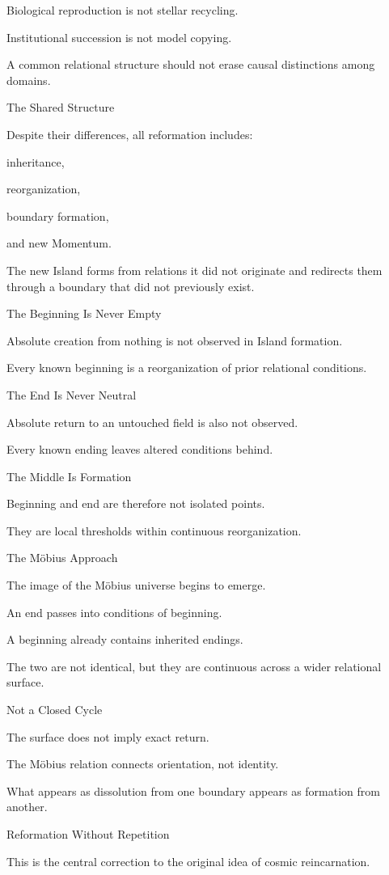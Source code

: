 Biological reproduction is not stellar recycling.

Institutional succession is not model copying.

A common relational structure should not erase causal distinctions among domains.

The Shared Structure

Despite their differences, all reformation includes:

inheritance,

reorganization,

boundary formation,

and new Momentum.

The new Island forms from relations it did not originate and redirects them through a boundary that did not previously exist.

The Beginning Is Never Empty

Absolute creation from nothing is not observed in Island formation.

Every known beginning is a reorganization of prior relational conditions.

The End Is Never Neutral

Absolute return to an untouched field is also not observed.

Every known ending leaves altered conditions behind.

The Middle Is Formation

Beginning and end are therefore not isolated points.

They are local thresholds within continuous reorganization.

The Möbius Approach

The image of the Möbius universe begins to emerge.

An end passes into conditions of beginning.

A beginning already contains inherited endings.

The two are not identical, but they are continuous across a wider relational surface.

Not a Closed Cycle

The surface does not imply exact return.

The Möbius relation connects orientation, not identity.

What appears as dissolution from one boundary appears as formation from another.

Reformation Without Repetition

This is the central correction to the original idea of cosmic reincarnation.

